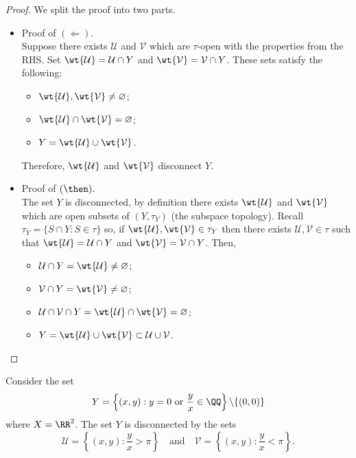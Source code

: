 \documentclass[12pt, a4paper]{article}
\begin{document}
\begin{proof}
    We split the proof into two parts.
    \begin{itemize}
        \item Proof of \((\Leftarrow).\) \\
        Suppose there exists \(\mathcal{U}\) and \(\mathcal{V}\) which are \(\tau\)-open with the properties from the RHS. Set \(\wt{\mathcal{U}}=\mathcal{U}\cap Y\) and \(\wt{\mathcal{V}}=\mathcal{V} \cap Y\). These sets satisfy the following:
        \begin{itemize}
            \item \(\wt{\mathcal{U}},\wt{\mathcal{V}} \neq \varnothing\);
            \item \(\wt{\mathcal{U}}\cap \wt{\mathcal{V}} = \varnothing\);
            \item \(Y= \wt{\mathcal{U}}\cup \wt{\mathcal{V}}\).
        \end{itemize}
        Therefore, \(\wt{\mathcal{U}}\) and \(\wt{\mathcal{V}}\) disconnect \(Y\).
        \item Proof of \((\then).\) \\
        The set \(Y\) is disconnected, by definition there exists \(\wt{\mathcal{U}}\) and \(\wt{\mathcal{V}}\) which are open subsets of \((Y,\tau_{Y})\) (the subspace topology). Recall \(\tau_Y = \{S \cap Y : S \in \tau\}\) so, if \(\wt{\mathcal{U}},\wt{\mathcal{V}} \in \tau_Y\) then there exists \(\mathcal{U},\mathcal{V} \in \tau\) such that \(\wt{\mathcal{U}} = \mathcal{U} \cap Y\) and \(\wt{\mathcal{V}}=\mathcal{V} \cap Y\). Then, 
        \begin{itemize}
            \item \(\mathcal{U} \cap Y =\wt{\mathcal{U}} \neq \varnothing\);
            \item \(\mathcal{V} \cap Y = \wt{\mathcal{V}} \neq \varnothing\);
            \item \(\mathcal{U} \cap \mathcal{V} \cap Y = \wt{\mathcal{U}} \cap \wt{\mathcal{V}}= \varnothing\);
            \item \(Y = \wt{\mathcal{U}} \cup \wt{\mathcal{V}} \subset \mathcal{U} \cup \mathcal{V}\).
        \end{itemize}
    \end{itemize}
\end{proof}

\begin{example}
    Consider the set 
    \[Y = \left\{(x,y) : y=0 \text{ or } \frac{y}{x} \in \QQ \right\} \backslash \{(0,0)\}\] 
    where \(X = \RR^2\). The set \(Y\) is disconnected by the sets 
    \[\mathcal{U} = \left\{ (x,y) : \frac{y}{x}>\pi \right\} \quad \text{and} \quad \mathcal{V} = \left\{ (x,y) : \frac{y}{x}<\pi \right\}.\]
\end{example}
\end{document}
